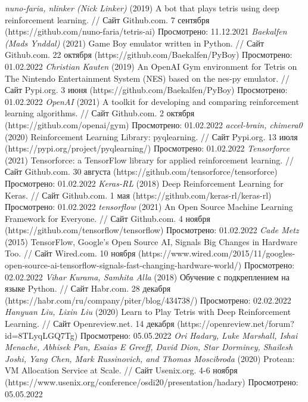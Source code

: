 \documentclass{article}
\begin{document}
\begin{center}
\begin{thebibliography}{}
 \textit{nuno-faria, nlinker (Nick Linker)} (2019) A bot that plays tetris using deep reinforcement learning. // Сайт Github.com. 7 сентября (https://github.com/nuno-faria/tetris-ai) Просмотрено: 11.12.2021
 \textit{Baekalfen (Mads Ynddal)} (2021) Game Boy emulator written in Python. // Сайт Github.com. 22 октября (https://github.com/Baekalfen/PyBoy) Просмотрено: 01.02.2022
 \textit{Christian Kauten} (2019) An OpenAI Gym environment for Tetris on The Nintendo Entertainment System (NES) based on the nes-py emulator. // Сайт Pypi.org. 3 июня (https://github.com/Baekalfen/PyBoy) Просмотрено: 01.02.2022
 \textit{OpenAI} (2021) A toolkit for developing and comparing reinforcement learning algorithms. // Сайт Github.com. 2 октября (https://github.com/openai/gym) Просмотрено: 01.02.2022
 \textit{accel-brain, chimera0} (2020) Reinforcement Learning Library: pyqlearning. // Сайт Pypi.org. 13 июля (https://pypi.org/project/pyqlearning/) Просмотрено: 01.02.2022
 \textit{Tensorforce} (2021) Tensorforce: a TensorFlow library for applied reinforcement learning. // Сайт Github.com. 30 августа (https://github.com/tensorforce/tensorforce) Просмотрено: 01.02.2022
 \textit{Keras-RL} (2018) Deep Reinforcement Learning for Keras. // Сайт Github.com. 1 мая (https://github.com/keras-rl/keras-rl) Просмотрено: 01.02.2022
 \textit{tensorflow} (2021) An Open Source Machine Learning Framework for Everyone. // Сайт Github.com. 4 ноября (https://github.com/tensorflow/tensorflow) Просмотрено: 01.02.2022
 \textit{Cade Metz} (2015) TensorFlow, Google's Open Source AI, Signals Big Changes in Hardware Too. // Сайт Wired.com. 10 ноября (https://www.wired.com/2015/11/googles-open-source-ai-tensorflow-signals-fast-changing-hardware-world/) Просмотрено: 02.02.2022
 \textit{Vihar Kurama, Samhita Alla} (2018) Обучение с подкреплением на языке Python. // Сайт Habr.com. 28 декабря (https://habr.com/ru/company/piter/blog/434738/) Просмотрено: 02.02.2022
 \textit{Hanyuan Liu, Lixin Liu} (2020) Learn to Play Tetris with Deep Reinforcement Learning. // Сайт Openreview.net. 14 декабря (https://openreview.net/forum?id=8TLyqLGQ7Tg) Просмотрено: 05.05.2022
 \textit{Ori Hadary, Luke Marshall, Ishai Menache, Abhisek Pan, Esaias E Greeff, David Dion, Star Dorminey, Shailesh Joshi, Yang Chen, Mark Russinovich, and Thomas Moscibroda} (2020) Protean: VM Allocation Service at Scale. // Сайт Usenix.org. 4-6 ноября (https://www.usenix.org/conference/osdi20/presentation/hadary) Просмотрено: 05.05.2022

\end{thebibliography}
\end{center}
\end{document}
